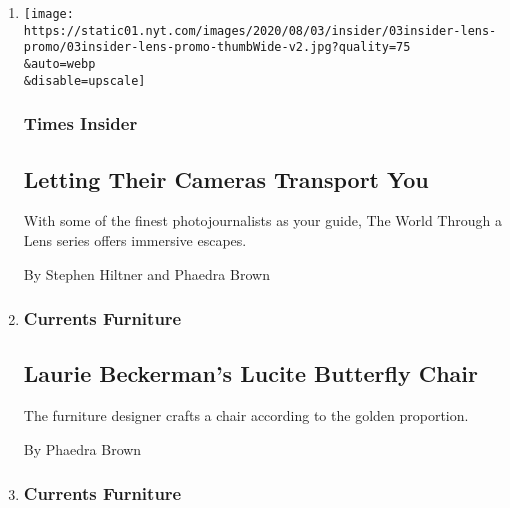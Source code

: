 \begin{enumerate}
\def\labelenumi{\arabic{enumi}.}
\item
  \href{/2020/08/03/insider/letting-their-cameras-transport-you.html}{}

  \texttt{[image: https://static01.nyt.com/images/2020/08/03/insider/03insider-lens-promo/03insider-lens-promo-thumbWide-v2.jpg?quality=75\\\&auto=webp\\\&disable=upscale]}

  \hypertarget{times-insider}{%
  \subsubsection{Times Insider}\label{times-insider}}

  \hypertarget{letting-their-cameras-transport-you}{%
  \subsection{Letting Their Cameras Transport
  You}\label{letting-their-cameras-transport-you}}

  With some of the finest photojournalists as your guide, The World
  Through a Lens series offers immersive escapes.

  By Stephen Hiltner and Phaedra Brown
\item
  \href{/2011/03/17/garden/17furniture.html}{}

  \hypertarget{currents--furniture}{%
  \subsubsection{Currents \textbar{}
  Furniture}\label{currents--furniture}}

  \hypertarget{laurie-beckermans-lucite-butterfly-chair}{%
  \subsection{Laurie Beckerman's Lucite Butterfly
  Chair}\label{laurie-beckermans-lucite-butterfly-chair}}

  The furniture designer crafts a chair according to the golden
  proportion.

  By Phaedra Brown
\item
  \href{/2011/03/10/garden/10furniture.html}{}

  \hypertarget{currents--furniture-1}{%
  \subsubsection{Currents \textbar{}
  Furniture}\label{currents--furniture-1}}


\end{enumerate}
